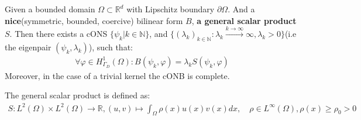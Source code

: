 \begin{theorem}
	Given a bounded domain $\Omega \subset \mathbb{R}^d$ with Lipschitz boundary $\partial \Omega$. And a \textbf{nice}(symmetric, bounded, coercive) bilinear form $B$, \textbf{a general scalar product} $S$. Then there exists a cONS $\{\psi_k | k \in \mathbb{N}\}$, and $\{(\lambda_k)_{k \in \mathbb{N}}: \lambda_k \overset{ k \rightarrow \infty}{\rightarrow} \infty, \lambda_k > 0 \}$(i.e the eigenpair $(\psi_k, \lambda_k)$), such that:
\begin{align*}
		\forall \varphi \in H^1_{\Gamma_D}(\Omega): B(\psi_k, \varphi) =\lambda_k S(\psi_k, \varphi) 
\end{align*}
Moreover, in the case of a trivial kernel the cONB is complete. 
\end{theorem}
\begin{remark}
The general scalar product is defined as:
\begin{align*}
	S: L^2(\Omega) \times L^2(\Omega) \rightarrow \mathbb{R}, 
	(u, v) \mapsto \int_\Omega \rho(x)u(x)v(x)dx , \quad \rho \in L^\infty(\Omega), \rho(x) \geq \rho_0 > 0
\end{align*}	
\end{remark}
